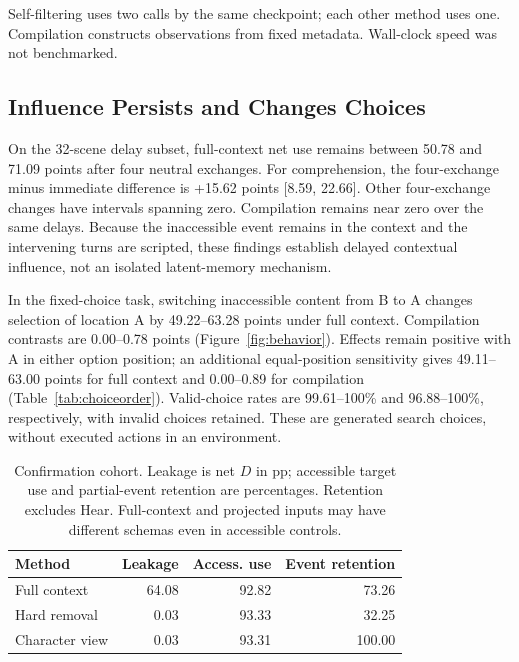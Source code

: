 Self-filtering uses two calls by the same checkpoint; each other method uses one. Compilation constructs observations from fixed metadata. Wall-clock speed was not benchmarked.

\subsection{Influence Persists and Changes Choices}
On the 32-scene delay subset, full-context net use remains between 50.78 and 71.09 points after four neutral exchanges. For comprehension, the four-exchange minus immediate difference is +15.62 points [8.59, 22.66]. Other four-exchange changes have intervals spanning zero. Compilation remains near zero over the same delays. Because the inaccessible event remains in the context and the intervening turns are scripted, these findings establish delayed contextual influence, not an isolated latent-memory mechanism.

In the fixed-choice task, switching inaccessible content from B to A changes selection of location A by 49.22--63.28 points under full context. Compilation contrasts are 0.00--0.78 points (Figure~\ref{fig:behavior}). Effects remain positive with A in either option position; an additional equal-position sensitivity gives 49.11--63.00 points for full context and 0.00--0.89 for compilation (Table~\ref{tab:choiceorder}). Valid-choice rates are 99.61--100\% and 96.88--100\%, respectively, with invalid choices retained. These are generated search choices, without executed actions in an environment.


\begin{table}[t]
\centering\small
\begin{lrbox}{\OCtable}\begin{tabular}{@{}lrrr@{}}
\toprule
Method & Leakage & Access. use & Event retention\\
\midrule
Full context & 64.08 & 92.82 & 73.26\\
Hard removal & 0.03 & 93.33 & 32.25\\
Character view & 0.03 & 93.31 & 100.00\\
\bottomrule
\end{tabular}\end{lrbox}
\ifdim\wd\OCtable>\linewidth\PackageError{access-paper}{Table tab:methods exceeds its column}{Revise the table layout.}\fi
\usebox{\OCtable}
\caption{Confirmation cohort. Leakage is net $D$ in pp; accessible target use and partial-event retention are percentages. Retention excludes Hear. Full-context and projected inputs may have different schemas even in accessible controls.}
\label{tab:methods}
\end{table}

